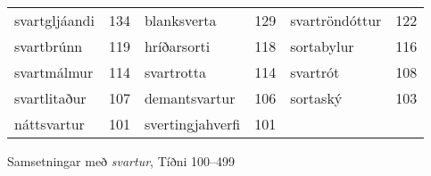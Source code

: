 \documentclass[../samsetningasafn.tex]{subfiles}
\begin{document}
\begin{wordlist}[H]
\begin{tcolorbox}
\begin{tabular}{BlBlBl}
		svartgljáandi & 134		& 
		blanksverta	& 129		& 
		svartröndóttur & 122	\\ 
		svartbrúnn	& 119		& 
		hríðarsorti	& 118		& 
		sortabylur	& 116		\\ 
		svartmálmur	& 114		& 
		svartrotta	& 114		& 
		svartrót	& 108		\\ 
		svartlitaður	& 107		& 
		demantsvartur & 106	& 
		sortaský	& 103		\\ 
		náttsvartur	& 101		& 
		svertingjahverfi & 101	& 
				&
	\end{tabular}

\end{tcolorbox}
	\caption{Samsetningar með \textit{svartur}, Tíðni 100--499}
	\label{listi:svart.100}
\end{wordlist}
\end{document}
